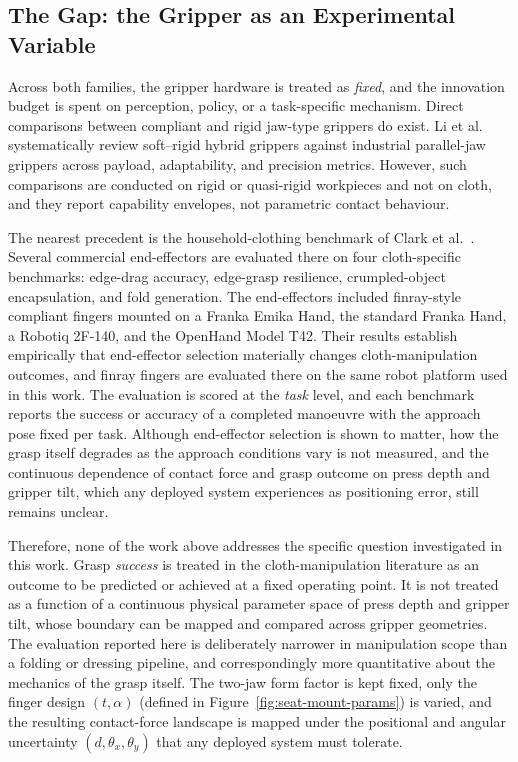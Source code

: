 \subsection{The Gap: the Gripper as an Experimental Variable}

Across both families, the gripper hardware is treated as \emph{fixed},
and the innovation budget is spent on perception, policy, or a
task-specific mechanism. Direct comparisons between compliant and rigid
jaw-type grippers do exist. Li et al.~\cite{li2025scopingreview}
systematically review soft--rigid hybrid grippers against industrial
parallel-jaw grippers across payload, adaptability, and precision
metrics. However, such comparisons are conducted on rigid or quasi-rigid
workpieces and not on cloth, and they report capability envelopes, not
parametric contact behaviour.

The nearest precedent is the household-clothing benchmark of Clark et
al.~\cite{clark2023household}. Several commercial end-effectors are
evaluated there on four cloth-specific benchmarks: edge-drag accuracy,
edge-grasp resilience, crumpled-object encapsulation, and fold
generation. The end-effectors included finray-style compliant fingers
mounted on a Franka Emika Hand, the standard Franka Hand, a Robotiq
2F-140, and the OpenHand Model T42. Their results establish empirically
that end-effector selection materially changes cloth-manipulation
outcomes, and finray fingers are evaluated there on the same robot
platform used in this work. The evaluation is scored at the \emph{task}
level, and each benchmark reports the success or accuracy of a completed
manoeuvre with the approach pose fixed per task. Although end-effector
selection is shown to matter, how the grasp itself degrades as the
approach conditions vary is not measured, and the continuous dependence
of contact force and grasp outcome on press depth and gripper tilt, which
any deployed system experiences as positioning error, still remains
unclear.

Therefore, none of the work above addresses the specific question
investigated in this work. Grasp \emph{success} is treated in the
cloth-manipulation literature as an outcome to be predicted or achieved
at a fixed operating point. It is not treated as a function of a
continuous physical parameter space of press depth and gripper tilt,
whose boundary can be mapped and compared across gripper geometries.
The evaluation reported here is deliberately narrower in manipulation
scope than a folding or dressing pipeline, and correspondingly more
quantitative about the mechanics of the grasp itself. The two-jaw form
factor is kept fixed, only the finger design $(t, \alpha)$ (defined in
Figure~\ref{fig:seat-mount-params}) is varied, and the resulting
contact-force landscape is mapped under the positional and angular
uncertainty $(d, \theta_x, \theta_y)$ that any deployed system must
tolerate.

